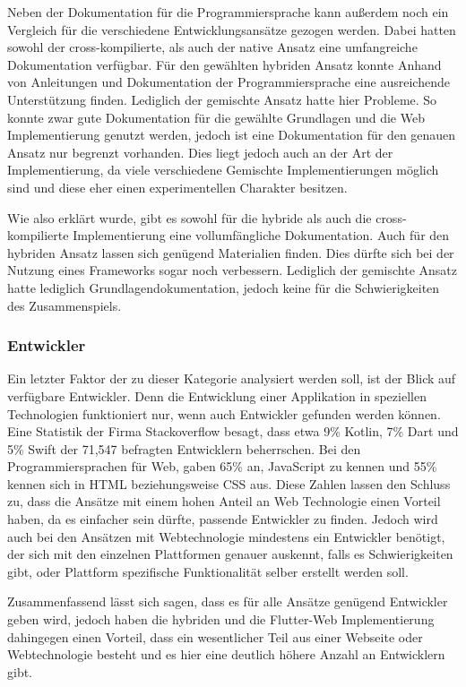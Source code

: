 Neben der Dokumentation für die Programmiersprache kann außerdem noch ein Vergleich für die verschiedene Entwicklungsansätze gezogen werden. Dabei hatten sowohl der cross-kompilierte, als auch der native Ansatz eine umfangreiche Dokumentation verfügbar. Für den gewählten hybriden Ansatz konnte Anhand von Anleitungen und Dokumentation der Programmiersprache eine ausreichende Unterstützung finden. Lediglich der gemischte Ansatz hatte hier Probleme. So konnte zwar gute Dokumentation für die gewählte Grundlagen und die Web Implementierung genutzt werden, jedoch ist eine Dokumentation für den genauen Ansatz nur begrenzt vorhanden. Dies liegt jedoch auch an der Art der Implementierung, da viele verschiedene Gemischte Implementierungen möglich sind und diese eher einen experimentellen Charakter besitzen.

Wie also erklärt wurde, gibt es sowohl für die hybride als auch die cross-kompilierte Implementierung eine vollumfängliche Dokumentation. Auch für den hybriden Ansatz lassen sich genügend Materialien finden. Dies dürfte sich bei der Nutzung eines Frameworks sogar noch verbessern. Lediglich der gemischte Ansatz hatte lediglich Grundlagendokumentation, jedoch keine für die Schwierigkeiten des Zusammenspiels. 

\subsubsection{Entwickler}
Ein letzter Faktor der zu dieser Kategorie analysiert werden soll, ist der Blick auf verfügbare Entwickler. Denn die Entwicklung einer Applikation in speziellen Technologien funktioniert nur, wenn auch Entwickler gefunden werden können. Eine Statistik \cite{statist_used_programming_languages} der Firma Stackoverflow besagt, dass etwa 9\% Kotlin, 7\% Dart und 5\% Swift der 71,547 befragten Entwicklern beherrschen.
Bei den Programmiersprachen für Web, gaben  65\% an, JavaScript zu kennen und 55\% kennen sich in HTML beziehungsweise CSS aus. Diese Zahlen lassen den Schluss zu, dass die Ansätze mit einem hohen Anteil an Web Technologie einen Vorteil haben, da es einfacher sein dürfte, passende Entwickler zu finden. Jedoch wird auch bei den Ansätzen mit Webtechnologie mindestens ein Entwickler benötigt, der sich mit den einzelnen Plattformen genauer auskennt, falls es Schwierigkeiten gibt, oder Plattform spezifische Funktionalität selber erstellt werden soll.

Zusammenfassend lässt sich sagen, dass es für alle Ansätze genügend Entwickler geben wird, jedoch haben die hybriden und die Flutter-Web Implementierung dahingegen einen Vorteil, dass ein wesentlicher Teil aus einer Webseite oder Webtechnologie besteht und es hier eine deutlich höhere Anzahl an Entwicklern gibt.


